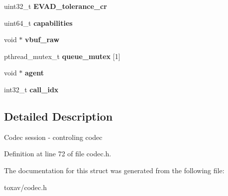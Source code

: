 \begin{DoxyCompactItemize}
\item 
\hypertarget{struct___c_s_session_aa799246d78fac3297846637588131763}{uint32\+\_\+t {\bfseries E\+V\+A\+D\+\_\+tolerance\+\_\+cr}}\label{struct___c_s_session_aa799246d78fac3297846637588131763}

\item 
\hypertarget{struct___c_s_session_ac9e675ead9b3559ea462414a0016f6a6}{uint64\+\_\+t {\bfseries capabilities}}\label{struct___c_s_session_ac9e675ead9b3559ea462414a0016f6a6}

\item 
\hypertarget{struct___c_s_session_abb525d3cf1486064b35b5821a0646c86}{void $\ast$ {\bfseries vbuf\+\_\+raw}}\label{struct___c_s_session_abb525d3cf1486064b35b5821a0646c86}

\item 
\hypertarget{struct___c_s_session_aa1e20c410f3ec23066afb256fa3d1254}{pthread\+\_\+mutex\+\_\+t {\bfseries queue\+\_\+mutex} \mbox{[}1\mbox{]}}\label{struct___c_s_session_aa1e20c410f3ec23066afb256fa3d1254}

\item 
\hypertarget{struct___c_s_session_a18e94ace0074984593ae281f6bbda315}{void $\ast$ {\bfseries agent}}\label{struct___c_s_session_a18e94ace0074984593ae281f6bbda315}

\item 
\hypertarget{struct___c_s_session_ad6b287fd08a0cc466cd41bd2e76d5808}{int32\+\_\+t {\bfseries call\+\_\+idx}}\label{struct___c_s_session_ad6b287fd08a0cc466cd41bd2e76d5808}

\end{DoxyCompactItemize}


\subsection{Detailed Description}
Codec session -\/ controling codec 

Definition at line 72 of file codec.\+h.



The documentation for this struct was generated from the following file\+:\begin{DoxyCompactItemize}
\item 
toxav/codec.\+h\end{DoxyCompactItemize}
